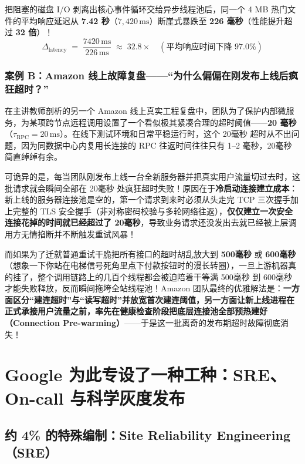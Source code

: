 \documentclass[a4paper]{article}
\begin{document}
把阻塞的磁盘 I/O 剥离出核心事件循环交给异步线程池后，同一个 4 MB 热门文件的平均响应延迟从 \textbf{7.42 秒}（$7,420\,\mathrm{ms}$）断崖式暴跌至 \textbf{226 毫秒}（性能提升超过 \textbf{32 倍}）！
\begin{equation}
\Delta_{\text{latency}} \;=\; \frac{7420\,\mathrm{ms}}{226\,\mathrm{ms}} \;\approx\; 32.8\times \quad (\text{平均响应时间下降 } 97.0\%)
\label{eq:nginx_aio_speedup}
\end{equation}

\subsubsection*{案例 B：Amazon 线上故障复盘——“为什么偏偏在刚发布上线后疯狂超时？”}
在主讲教师剖析的另一个 Amazon 线上真实工程复盘中，团队为了保护内部微服务，为某项跨节点远程调用设置了一个看似极其紧凑合理的超时阈值——\textbf{20 毫秒}（$\tau_{\text{RPC}} = 20\,\mathrm{ms}$）。在线下测试环境和日常平稳运行时，这个 20毫秒 超时从不出问题，因为同数据中心内复用长连接的 RPC 往返时间往往只有 1--2 毫秒，20毫秒 简直绰绰有余。

可诡异的是，每当团队刚发布上线一台全新服务器并把真实用户流量切过去时，这批请求就会瞬间全部在 20毫秒 处疯狂超时失败！原因在于\textbf{冷启动连接建立成本}：新上线的服务器连接池是空的，第一个请求到来时必须从头走完 TCP 三次握手加上完整的 TLS 安全握手（非对称密码校验与多轮网络往返），\textbf{仅仅建立一次安全连接花掉的时间就已经超过了 \textbf{20毫秒}}，导致业务请求还没发出去就已经被上层调用方无情掐断并不断触发重试风暴！

而如果为了迁就普通重试干脆把所有接口的超时胡乱放大到 \textbf{500毫秒} 或 \textbf{600毫秒}（想象一下你站在电梯信号死角里点下付款按钮时的漫长转圈），一旦上游机器真的挂了，整个调用链路上的几百个线程都会被迫陪着干等满 500毫秒 到 600毫秒 才能失败释放，反而瞬间拖垮全站线程池！Amazon 团队最终的优雅解法是：\textbf{一方面区分“建连超时”与“读写超时”并放宽首次建连阈值，另一方面让新上线进程在正式承接用户流量之前，率先在健康检查阶段把底层连接池全部预热建好（Connection Pre-warming）}——于是这一批离奇的发布期超时故障彻底消失！

\section{Google 为此专设了一种工种：SRE、On-call 与科学灰度发布}

\subsection{约 4\% 的特殊编制：Site Reliability Engineering（SRE）}
\end{document}
